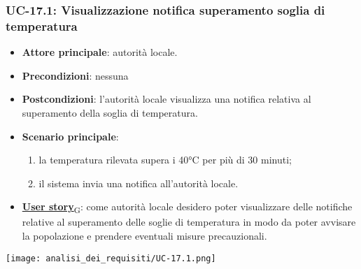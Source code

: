 \subsubsection{UC-17.1: Visualizzazione notifica superamento soglia di temperatura}
\begin{itemize}
	\item \textbf{Attore principale}: autorità locale.
	\item \textbf{Precondizioni}: nessuna
	\item \textbf{Postcondizioni}: l'autorità locale visualizza una notifica relativa al superamento della soglia di temperatura.
	\item \textbf{Scenario principale}:
	      \begin{enumerate}
		      \item la temperatura rilevata supera i 40°C per più di 30 minuti;
		      \item il sistema invia una notifica all'autorità locale.
	      \end{enumerate}
	\item \href{https://7last.github.io/docs/pb/documentazione-interna/glossario\#user-story}{\textbf{User story}\textsubscript{G}}:
	      come autorità locale desidero poter visualizzare delle notifiche relative al superamento delle soglie di temperatura
	      in modo da poter avvisare la popolazione e prendere eventuali misure precauzionali.
\end{itemize}
\begin{center}
	\texttt{[image: analisi\_dei\_requisiti/UC-17.1.png]}
\end{center}

